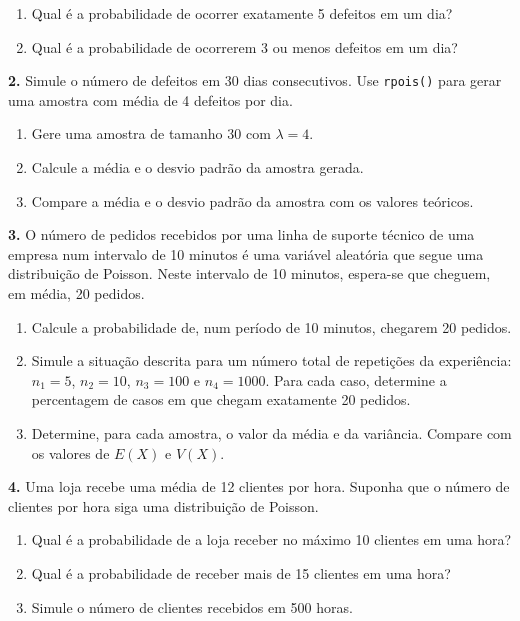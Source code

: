 \documentclass[
]{book}
\providecommand{\tightlist}{%
  \setlength{\itemsep}{0pt}\setlength{\parskip}{0pt}}
\begin{document}
\begin{enumerate}
\def\labelenumi{(\alph{enumi})}
\tightlist
\item
  Qual é a probabilidade de ocorrer exatamente 5 defeitos em um dia?
\item
  Qual é a probabilidade de ocorrerem 3 ou menos defeitos em um dia?
\end{enumerate}

\textbf{2.} Simule o número de defeitos em 30 dias consecutivos. Use \texttt{rpois()} para gerar uma amostra com média de 4 defeitos por dia.

\begin{enumerate}
\def\labelenumi{(\alph{enumi})}
\tightlist
\item
  Gere uma amostra de tamanho 30 com \(\lambda = 4\).
\item
  Calcule a média e o desvio padrão da amostra gerada.
\item
  Compare a média e o desvio padrão da amostra com os valores teóricos.
\end{enumerate}

\textbf{3.} O número de pedidos recebidos por uma linha de suporte
técnico de uma empresa num intervalo de 10 minutos é uma variável
aleatória que segue uma distribuição de Poisson. Neste intervalo de 10
minutos, espera-se que cheguem, em média, 20 pedidos.

\begin{enumerate}
\def\labelenumi{(\alph{enumi})}
\item
  Calcule a probabilidade de, num período de 10 minutos, chegarem 20
  pedidos.
\item
  Simule a situação descrita para um número total de repetições da
  experiência: \(n_1=5\), \(n_2=10\), \(n_3=100\) e \(n_4=1000\). Para cada
  caso, determine a percentagem de casos em que chegam exatamente 20
  pedidos.
\item
  Determine, para cada amostra, o valor da média e da variância.
  Compare com os valores de \(E(X)\) e \(V(X)\).
\end{enumerate}

\textbf{4.} Uma loja recebe uma média de 12 clientes por hora. Suponha que o número de clientes por hora siga uma distribuição de Poisson.

\begin{enumerate}
\def\labelenumi{(\alph{enumi})}
\item
  Qual é a probabilidade de a loja receber no máximo 10 clientes em uma hora?
\item
  Qual é a probabilidade de receber mais de 15 clientes em uma hora?
\item
  Simule o número de clientes recebidos em 500 horas.
\end{enumerate}
\end{document}
